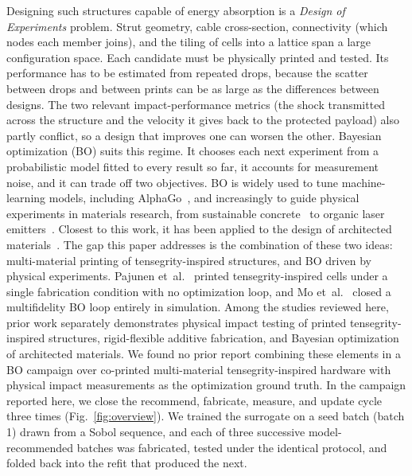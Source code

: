 \documentclass[11pt]{article}
\begin{document}
Designing such structures capable of energy absorption is a
\emph{Design of Experiments} problem. Strut geometry, cable
cross-section, connectivity (which nodes each member joins), and the
tiling of cells into a lattice span a large configuration space. Each candidate must be physically printed and
tested. Its performance has to be estimated from repeated drops,
because the scatter between drops and between prints can be as large as
the differences between designs. The two relevant impact-performance
metrics (the shock transmitted across the structure and the velocity it
gives back to the protected payload) also partly conflict, so a design
that improves one can worsen the other. Bayesian optimization (BO)
suits this regime. It chooses each next experiment from a probabilistic
model fitted to every result so far, it accounts for measurement noise,
and it can trade off two objectives. BO is widely used to tune
machine-learning models, including
AlphaGo~\citep{chen2018bayesianoptimizationalphago}, and increasingly to
guide physical experiments in materials research, from sustainable
concrete~\citep{ament2023sustainable} to organic laser
emitters~\citep{striethkalthoff2024delocalized}. Closest to this work,
it has been applied to the design of architected
materials~\citep{mo2023accelerated, zhang2021bo}.
The gap this paper addresses is the combination of these two ideas:
multi-material printing of tensegrity-inspired structures, and BO
driven by physical experiments.
Pajunen et~al.~\cite{pajunen2019design} printed tensegrity-inspired
cells under a single fabrication condition with no optimization loop,
and Mo et~al.~\cite{mo2023accelerated} closed a multifidelity BO loop
entirely in simulation. Among the studies reviewed here, prior work
separately demonstrates physical impact testing of printed
tensegrity-inspired structures, rigid-flexible additive fabrication,
and Bayesian optimization of architected materials. We found no prior
report combining these elements in a BO campaign over co-printed
multi-material tensegrity-inspired hardware with physical impact
measurements as the optimization ground truth. In the campaign reported
here, we close the recommend, fabricate, measure, and update cycle three
times (Fig.~\ref{fig:overview}). We trained the surrogate on a seed
batch (batch 1) drawn from a Sobol sequence, and each of three
successive model-recommended batches was fabricated, tested under the
identical protocol, and folded back into the refit that produced the
next.
\end{document}
